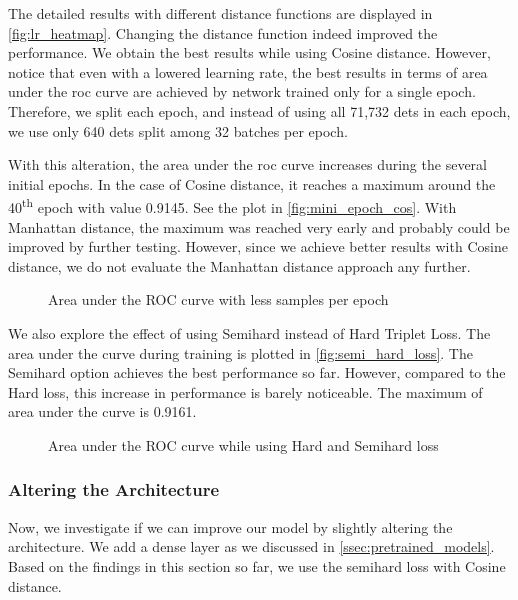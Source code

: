 The detailed results with different distance functions are displayed in \autoref{fig:lr_heatmap}. Changing the distance function indeed improved the performance. We obtain the best results while using Cosine distance. However, notice that even with a lowered learning rate, the best results in terms of area under the \gls{roc} curve are achieved by network trained only for a single epoch. Therefore, we split each epoch, and instead of using all 71,732 \glspl{det} in each epoch, we use only 640 \glspl{det} split among 32 batches per epoch.

With this alteration, the area under the \gls{roc} curve increases during the several initial epochs. In the case of Cosine distance, it reaches a maximum around the 40\textsuperscript{th} epoch with value 0.9145. See the plot in \autoref{fig:mini_epoch_cos}. With Manhattan distance, the maximum was reached very early and probably could be improved by further testing. However, since we achieve better results with Cosine distance, we do not evaluate the Manhattan distance approach any further.

\begin{figure}
    \centering
    \def\svgwidth{\columnwidth}
    
    \caption{Area under the ROC curve with less samples per epoch}
    \label{fig:mini_epoch_cos}
\end{figure}

We also explore the effect of using Semihard instead of Hard Triplet Loss. The area under the curve during training is plotted in \autoref{fig:semi_hard_loss}. The Semihard option achieves the best performance so far. However, compared to the Hard loss, this increase in performance is barely noticeable. The maximum of area under the curve is 0.9161.

\begin{figure}
    \centering
    \def\svgwidth{\columnwidth}
    
    \caption{Area under the ROC curve while using Hard and Semihard loss}
    \label{fig:semi_hard_loss}
\end{figure}

\subsubsection{Altering the Architecture}

Now, we investigate if we can improve our model by slightly altering the architecture. We add a dense layer as we discussed in \autoref{ssec:pretrained_models}. Based on the findings in this section so far, we use the semihard loss with Cosine distance.

